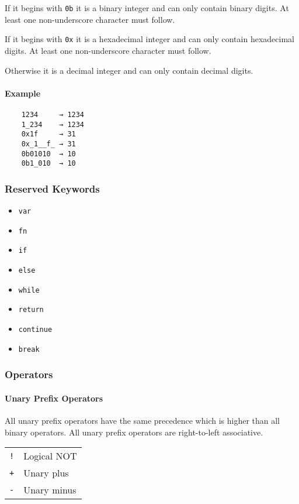 If it begins with \verb|0b| it is a binary integer and can only contain binary digits. At least one non-underscore character must follow.

If it begins with \verb|0x| it is a hexadecimal integer and can only contain hexadecimal digits. At least one non-underscore character must follow.

Otherwise it is a decimal integer and can only contain decimal digits.

\paragraph{Example}

\begin{verbatim}
    1234     → 1234
    1_234    → 1234
    0x1f     → 31
    0x_1__f_ → 31
    0b01010  → 10
    0b1_010  → 10
\end{verbatim}

\subsubsection{Reserved Keywords}

\begin{itemize}
    \item \verb|var|
    \item \verb|fn|
    \item \verb|if|
    \item \verb|else|
    \item \verb|while|
    \item \verb|return|
    \item \verb|continue|
    \item \verb|break|
\end{itemize}

\subsubsection{Operators}

\paragraph{Unary Prefix Operators}

All unary prefix operators have the same precedence which is higher than all binary operators. All unary prefix operators are right-to-left associative.

\begin{table}[H]
    \begin{tabular}{ l l }
        \verb|!| & Logical NOT \\
        \verb|+| & Unary plus  \\
        \verb|-| & Unary minus
    \end{tabular}
\end{table}


